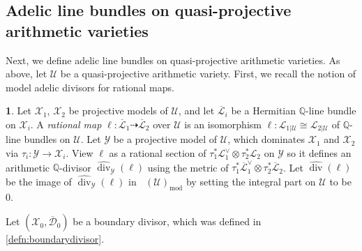 \documentclass[11pt,reqno]{amsart}
\newcommand{\mQ}{\mathbb{Q}}
\newcommand{\cX}{\mathcal{X}}
\newcommand{\cY}{\mathcal{Y}}
\newcommand{\cD}{\mathcal{D}}
\newcommand{\cU}{\mathcal{U}}
\newcommand{\cL}{\mathcal{L}}
\theoremstyle{theorem}
\numberwithin{equation}{subsection}
\numberwithin{equation}{subsection}
\theoremstyle{definition}
\newtheorem{definition}[subsubsection]{\text{Definition}}
\theoremstyle{remark}
\numberwithin{equation}{subsubsection} \numberwithin{figure}{section}
\DeclareMathOperator{\ddiv}{div}
\DeclareMathOperator{\aDiv}{\widehat{Div}}
\newcommand{\cdef}[1]{\textsf{\textit{#1}}}
\DeclareMathOperator{\model}{mod}
\begin{document}
\subsection{Adelic line bundles on quasi-projective arithmetic varieties}
Next, we define adelic line bundles on quasi-projective arithmetic varieties. 
As above, let $\cU$ be a quasi-projective arithmetic variety. 
First, we recall the notion of model adelic divisors for rational maps.

\begin{definition}
Let $\cX_1$, $\cX_2$ be projective models of $\cU$, and let $\overline{\cL}_i$ be a Hermitian $\mQ$-line bundle on $\cX_i$. 
A \cdef{rational map} $\ell\colon \overline{\cL}_1 \dashrightarrow \overline{\cL}_2$ over $\cU$ is an isomorphism $\ell \colon \cL_{1|\cU} \cong \cL_{2|\cU}$ of $\mQ$-line bundles on $\cU$. 
Let $\cY$ be a projective model of $\cU$, which dominates $\cX_1$ and $\cX_2$ via $\tau_i\colon \cY \to \cX_i$. 
View $\ell$ as a rational section of $\tau_1^*\cL_1^{\vee}\otimes \tau_2^*\cL_2$ on $\cY$ so it defines an arithmetic $\mQ$-divisor $\widehat{\ddiv}_{\cY}(\ell)$ using the metric of $\tau_1^*\overline{\cL}_1^{\vee}\otimes \tau_2^*\overline{\cL}_2$. 
Let $\widehat{\ddiv}(\ell)$ be the image of $\widehat{\ddiv}_{\cY}(\ell)$ in $\aDiv(\cU)_{\model}$ by setting the integral part on $\cU$ to be 0. 
\end{definition}

Let $(\cX_0,\overline{\cD}_0)$ be a boundary divisor, which was defined in \autoref{defn:boundarydivisor}. 
\end{document}
